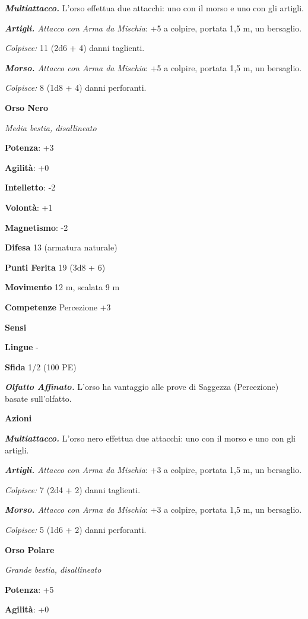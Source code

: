 \begin{multicols}{2}
\emph{\textbf{Multiattacco.}} L'orso effettua due attacchi: uno con il
morso e uno con gli artigli.

\emph{\textbf{Artigli.} Attacco con Arma da Mischia}: +5 a colpire,
portata 1,5 m, un bersaglio.

\emph{Colpisce:} 11 (2d6 + 4) danni taglienti.

\emph{\textbf{Morso.} Attacco con Arma da Mischia}: +5 a colpire,
portata 1,5 m, un bersaglio.

\emph{Colpisce:} 8 (1d8 + 4) danni perforanti.

\textbf{Orso Nero}

\emph{Media bestia, disallineato}

\textbf{Potenza}: +3

\textbf{Agilità}: +0

\textbf{Intelletto}: -2

\textbf{Volontà}: +1

\textbf{Magnetismo}: -2

\textbf{Difesa} 13 (armatura naturale)

\textbf{Punti Ferita} 19 (3d8 + 6)

\textbf{Movimento} 12 m, scalata 9 m

\textbf{Competenze} Percezione +3

\textbf{Sensi} 

\textbf{Lingue} -

\textbf{Sfida} 1/2 (100 PE)

\emph{\textbf{Olfatto Affinato.}} L'orso ha vantaggio alle prove di
Saggezza (Percezione) basate sull'olfatto.

\textbf{Azioni}

\emph{\textbf{Multiattacco.}} L'orso nero effettua due attacchi: uno con
il morso e uno con gli artigli.

\emph{\textbf{Artigli.} Attacco con Arma da Mischia}: +3 a colpire,
portata 1,5 m, un bersaglio.

\emph{Colpisce:} 7 (2d4 + 2) danni taglienti.

\emph{\textbf{Morso.} Attacco con Arma da Mischia}: +3 a colpire,
portata 1,5 m, un bersaglio.

\emph{Colpisce:} 5 (1d6 + 2) danni perforanti.

\textbf{Orso Polare}

\emph{Grande bestia, disallineato}

\textbf{Potenza}: +5

\textbf{Agilità}: +0


\end{multicols}
